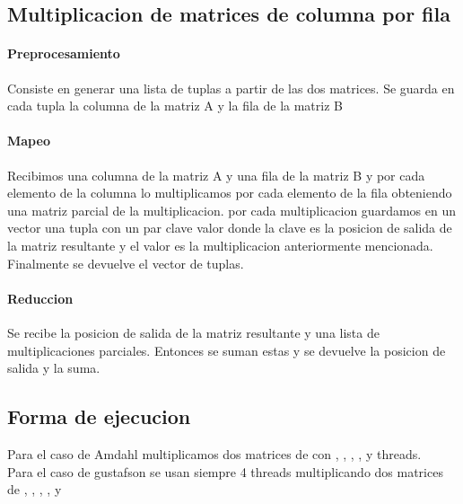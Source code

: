 \subsection{Multiplicacion de matrices de columna por fila}

    \paragraph{Preprocesamiento}

        Consiste en generar una lista de tuplas a partir de las dos matrices.
        Se guarda en cada tupla la columna  de la matriz A y la fila
         de la matriz B

    \paragraph{Mapeo}
        Recibimos una columna de la matriz A y una fila de la matriz B y por cada
        elemento de la columna  lo multiplicamos por cada elemento
        de la fila  obteniendo una matriz parcial de la
        multiplicacion. por cada multiplicacion guardamos en un vector una tupla
        con un par clave valor donde la clave es la posicion de salida de la matriz
        resultante y el valor es la multiplicacion anteriormente mencionada.
        Finalmente se devuelve el vector de tuplas.

    \paragraph{Reduccion}

        Se recibe la posicion de salida de la matriz resultante y una lista de
        multiplicaciones parciales. Entonces se suman estas y se devuelve la
        posicion de salida y la suma.



\subsection{Forma de ejecucion}
    Para el caso de Amdahl multiplicamos dos matrices de 
    con , , , ,  y  threads.\\

    Para el caso de gustafson se usan siempre 4 threads multiplicando dos matrices
    de , , , ,  y
    \\

